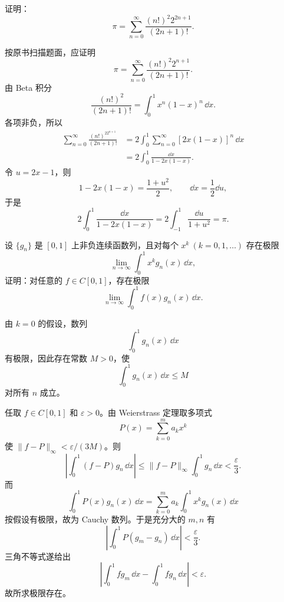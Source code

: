 \begin{xreferenceproblem}[6]
证明：
\[
  \pi=\sum_{n=0}^{\infty}\frac{(n!)^2 2^{2n+1}}{(2n+1)!}.
\]
\end{xreferenceproblem}
\begin{xsolution}
按原书扫描题面，应证明
\[
  \pi=\sum_{n=0}^{\infty}
  \frac{(n!)^2 2^{n+1}}{(2n+1)!}.
\]
由 Beta 积分
\[
  \frac{(n!)^2}{(2n+1)!}
  =\int_0^1x^n(1-x)^n\,\dd x.
\]
各项非负，所以
\[
\begin{aligned}
  \sum_{n=0}^{\infty}\frac{(n!)^22^{n+1}}{(2n+1)!}
  &=2\int_0^1\sum_{n=0}^{\infty}[2x(1-x)]^n\,\dd x\\
  &=2\int_0^1\frac{\dd x}{1-2x(1-x)}.
\end{aligned}
\]
令 $u=2x-1$，则
\[
  1-2x(1-x)=\frac{1+u^2}{2},\qquad \dd x=\frac12\dd u,
\]
于是
\[
  2\int_0^1\frac{\dd x}{1-2x(1-x)}
  =2\int_{-1}^1\frac{\dd u}{1+u^2}=\pi.
\]
\end{xsolution}


\begin{xreferenceproblem}[7]
设 $\{g_n\}$ 是 $[0,1]$ 上非负连续函数列，且对每个 $x^k\ (k=0,1,\ldots)$ 存在极限
\[
  \lim_{n\to\infty}\int_0^1x^kg_n(x)\,\dd x,
\]
证明：对任意的 $f\in C[0,1]$，存在极限
\[
  \lim_{n\to\infty}\int_0^1f(x)g_n(x)\,\dd x.
\]
\end{xreferenceproblem}
\begin{xsolution}
由 $k=0$ 的假设，数列
\[
  \int_0^1g_n(x)\,\dd x
\]
有极限，因此存在常数 $M>0$，使
\[
  \int_0^1g_n(x)\,\dd x\leqslant M
\]
对所有 $n$ 成立。

任取 $f\in C[0,1]$ 和 $\varepsilon>0$。由 Weierstrass 定理取多项式
\[
  P(x)=\sum_{k=0}^ma_kx^k
\]
使 $\|f-P\|_\infty<\varepsilon/(3M)$。则
\[
  \left|\int_0^1(f-P)g_n\,\dd x\right|
  \leqslant\|f-P\|_\infty\int_0^1g_n\,\dd x<\frac\varepsilon3.
\]
而
\[
  \int_0^1P(x)g_n(x)\,\dd x
  =\sum_{k=0}^ma_k\int_0^1x^kg_n(x)\,\dd x
\]
按假设有极限，故为 Cauchy 数列。于是充分大的 $m,n$ 有
\[
  \left|\int_0^1P(g_m-g_n)\,\dd x\right|<\frac\varepsilon3.
\]
三角不等式遂给出
\[
  \left|\int_0^1fg_m\,\dd x-\int_0^1fg_n\,\dd x\right|<\varepsilon.
\]
故所求极限存在。
\end{xsolution}



